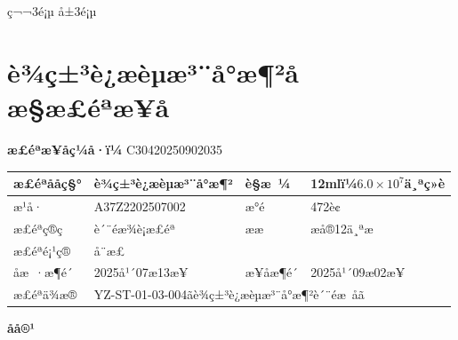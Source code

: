 \documentclass[UTF8,10pt,a4paper,fontset=fandol]{ctexart}
\newcommand{\fieldvalue}[1]{#1}
\begin{document}
\begin{center}
ç¬¬3é¡µ å±3é¡µ
\end{center}

\newpage

\section*{è¾ç±³è¿æèµæ³¨å°æ¶²åæ§æ£éªæ¥å}

\textbf{æ£éªæ¥åç¼å·ï¼}
\fieldvalue{C30420250902035}

\begin{tabularx}{\textwidth}{|p{2.2cm}|X|p{1.8cm}|X|}
\hline
æ£éªååç§° &
\fieldvalue{è¾ç±³è¿æèµæ³¨å°æ¶²}
&
è§æ ¼ &
\fieldvalue{12mlï¼$6.0\times10^{7}$ä¸ªç»è}
\\ \hline
æ¹å· &
\fieldvalue{A37Z2202507002}
&
æ°é &
\fieldvalue{472è¢}
\\ \hline
æ£éªç®ç &
\fieldvalue{è´¨éæ¾è¡æ£éª}
&
ææ &
\fieldvalue{æå®12ä¸ªæ}
\\ \hline
æ£éªé¡¹ç® &
\fieldvalue{å¨æ£}
&
\multicolumn{2}{l|}{}
\\ \hline
åæ ·æ¶é´ &
\fieldvalue{2025å¹´07æ13æ¥}
&
æ¥åæ¶é´ &
\fieldvalue{2025å¹´09æ02æ¥}
\\ \hline
æ£éªä¾æ® &
\multicolumn{3}{l|}{
\fieldvalue{YZ-ST-01-03-004ãè¾ç±³è¿æèµæ³¨å°æ¶²è´¨éæ åã}
}
\\ \hline
\end{tabularx}

\begin{center}
\textbf{å\quad å®¹}
\end{center}
\end{document}
